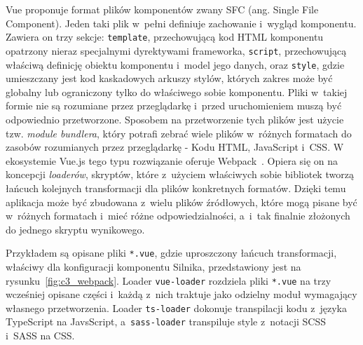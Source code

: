 Vue proponuje format plików komponentów zwany SFC (ang. Single File Component). Jeden taki plik w~pełni definiuje zachowanie i~wygląd komponentu. Zawiera on trzy sekcje: \texttt{template}, przechowującą kod HTML komponentu opatrzony nieraz specjalnymi dyrektywami frameworka, \texttt{script}, przechowującą właściwą definicję obiektu komponentu i~model jego danych, oraz \texttt{style}, gdzie umieszczany jest kod kaskadowych arkuszy stylów, których zakres może być globalny lub ograniczony tylko do właściwego sobie komponentu. Pliki w~takiej formie nie są rozumiane przez przeglądarkę i~przed uruchomieniem muszą być odpowiednio przetworzone. Sposobem na przetworzenie tych plików jest użycie tzw. \textit{module bundlera}, który potrafi zebrać wiele plików w~różnych formatach do zasobów rozumianych przez przeglądarkę - Kodu HTML, JavaScript i~CSS. W ekosystemie Vue.js tego typu rozwiązanie oferuje \mbox{Webpack~\cite{Webpack}.} Opiera się on na koncepcji \textit{loaderów}, skryptów, które z~użyciem właściwych sobie bibliotek tworzą łańcuch kolejnych transformacji dla plików konkretnych formatów. Dzięki temu aplikacja może być zbudowana z~wielu plików źródłowych, które mogą pisane być w~różnych formatach i~mieć różne odpowiedzialności, a~i~tak finalnie złożonych do jednego skryptu wynikowego. 

Przykładem są opisane pliki \texttt{*.vue}, gdzie uproszczony łańcuch transformacji, właściwy dla konfiguracji komponentu Silnika, przedstawiony jest na rysunku~\ref{fig:c3_webpack}. Loader \texttt{vue-loader} rozdziela pliki \texttt{*.vue} na trzy wcześniej opisane części i~każdą z~nich traktuje jako odzielny moduł wymagający własnego przetworzenia. Loader \texttt{ts-loader} dokonuje transpilacji kodu z~języka TypeScript na JavsScript, a~\texttt{sass-loader} transpiluje style z~notacji SCSS i~SASS na CSS.

